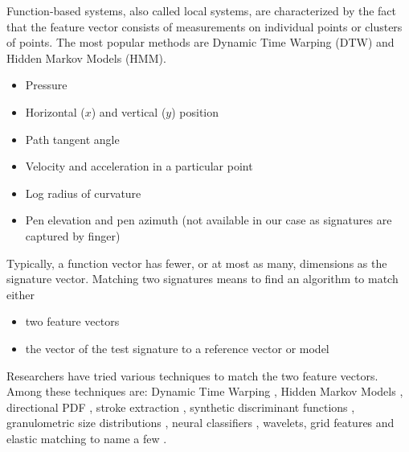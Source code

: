 \documentclass[a4paper, oneside]{csthesis}
\begin{document}


Function-based systems, also called local systems, are characterized by the fact that the feature vector consists of measurements on individual points or clusters of points.
The most popular methods are Dynamic Time Warping (DTW) and Hidden Markov Models (HMM).

\begin{itemize}
\item Pressure
\item Horizontal ($x$) and vertical ($y$) position
\item Path tangent angle
\item Velocity and acceleration in a particular point
\item Log radius of curvature
\item Pen elevation and pen azimuth (not available in our case as signatures are captured by finger)
\end{itemize}

Typically, a function vector has fewer, or at most as many, dimensions as the signature vector. Matching two signatures means to find an algorithm to match either
\begin{itemize}
\item two feature vectors
\item the vector of the test signature to a reference vector or model
\end{itemize}

Researchers have tried various techniques to match the two feature vectors. Among these techniques are: Dynamic Time Warping \cite{Herbst98onan, citeulike:891512}, Hidden Markov Models \cite{Justino00anoff-line}, directional PDF \cite{drouhard_1996_pr}, stroke extraction \cite{1047809}, synthetic discriminant functions \cite{Wilkinson:91}, granulometric size distributions \cite{615447}, neural classifiers \cite{Bajaj19971}, wavelets\cite{Ramesh1999217}, grid features\cite{Qi19941621} and elastic matching\cite{citeulike:941886} to name a few \cite{PiyushShanker:2007:OSV:1274199.1274423}.

\end{document}
